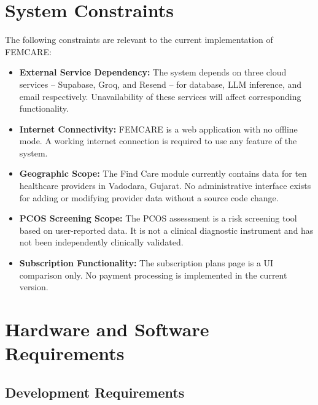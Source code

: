 \section{System Constraints}
\label{sec:constraints}

The following constraints are relevant to the current implementation of FEMCARE:

\begin{itemize}
    \item \textbf{External Service Dependency:} The system depends on three cloud services -- Supabase, Groq, and Resend -- for database, LLM inference, and email respectively. Unavailability of these services will affect corresponding functionality.

    \item \textbf{Internet Connectivity:} FEMCARE is a web application with no offline mode. A working internet connection is required to use any feature of the system.

    \item \textbf{Geographic Scope:} The Find Care module currently contains data for ten healthcare providers in Vadodara, Gujarat. No administrative interface exists for adding or modifying provider data without a source code change.

    \item \textbf{PCOS Screening Scope:} The PCOS assessment is a risk screening tool based on user-reported data. It is not a clinical diagnostic instrument and has not been independently clinically validated.

    \item \textbf{Subscription Functionality:} The subscription plans page is a UI comparison only. No payment processing is implemented in the current version.
\end{itemize}

\section{Hardware and Software Requirements}
\label{sec:hw-sw}

\subsection{Development Requirements}

